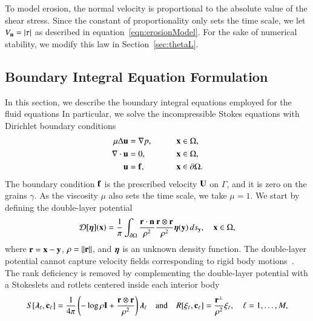 \documentclass[preprint, 10pt]{elsarticle}
\begin{document}
To model erosion, the normal velocity is  proportional to the absolute
value of the shear stress.   Since the constant of proportionality only
sets the time scale, we let $V_{\mathbf{n}} = |\tau|$ as described in
equation~\eqref{eqn:erosionModel}. For the sake of numerical stability,
we modify this law in Section~\ref{sec:thetaL}.

\subsection{Boundary Integral Equation Formulation} 
\label{sec:bies}

In this section, we describe the boundary integral equations employed
for the fluid equations \cite{Moore2007}
In particular, we solve the incompressible Stokes equations
with Dirichlet boundary conditions 
\begin{alignat*}{3}
  \mu\Delta {\mathbf{u}} &= {\nabla} p, \qquad && {\mathbf{x}} \in \Omega, \\
  {\nabla} \cdot {\mathbf{u}} &= 0,   && {\mathbf{x}} \in \Omega, \\
  {\mathbf{u}} &= {\mathbf{f}},  && {\mathbf{x}} \in {\partial}\Omega.
\end{alignat*}
The boundary condition ${\mathbf{f}}$ is the prescribed velocity ${\mathbf{U}}$ on
$\Gamma$, and it is zero on the grains $\gamma$.  As the viscosity $\mu$
also sets the time scale, we take $\mu=1$.  We start by defining the
double-layer potential
\begin{align}
  {\mathcal{D}}[{\boldsymbol\eta}]({\mathbf{x}}) = \frac{1}{\pi} \int_{{\partial}\Omega} 
    \frac{{\mathbf{r}} \cdot {\mathbf{n}}}{\rho^2} \frac{{\mathbf{r}} \otimes {\mathbf{r}}}{\rho^2} 
    {\boldsymbol\eta}({\mathbf{y}}) \, ds_{\mathbf{y}}, \quad {\mathbf{x}} \in \Omega,
    \label{eqn:velocityDLP}
\end{align}
where ${\mathbf{r}} = {\mathbf{x}} - {\mathbf{y}}$, $\rho = \|{\mathbf{r}}\|$, and ${\boldsymbol\eta}$ is an unknown density function.  The
double-layer potential cannot capture velocity fields corresponding to
rigid body motions~\cite{pow-mir1987}.  The rank deficiency is removed
by complementing the double-layer potential with a Stokeslets and
rotlets centered inside each interior body
\begin{align}
  S[{\boldsymbol\lambda}_\ell,{\mathbf{c}}_\ell] = \frac{1}{4\pi} \left(-\log \rho {\mathbf{I}} + 
    \frac{{\mathbf{r}} \otimes {\mathbf{r}}}{\rho^2} \right){\boldsymbol\lambda}_\ell
  \quad \text{and} \quad
  R[\xi_\ell,{\mathbf{c}}_\ell] = \frac{{\mathbf{r}}^\perp}{\rho^2}\xi_\ell, 
  \quad \ell=1,\ldots,M,
  \label{eqn:stokeslet_rotlet}
\end{align}
\end{document}
